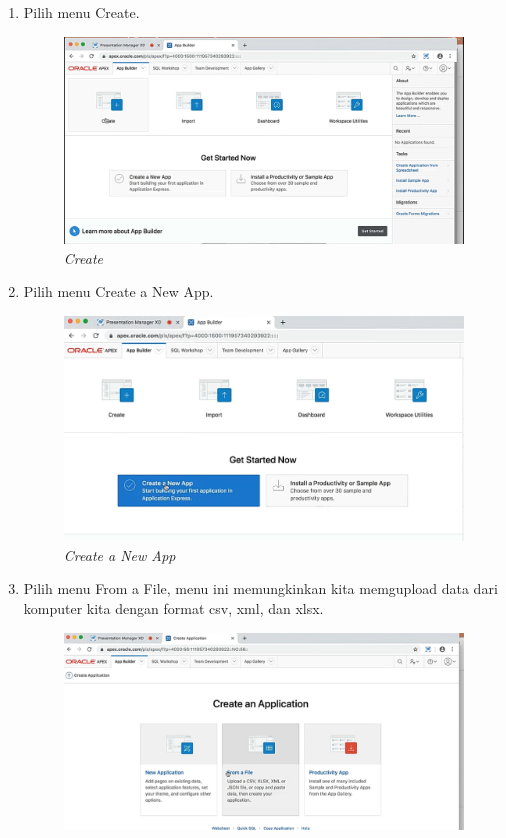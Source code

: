 \begin{enumerate}
\begin{figure}[H]
    \label{AppBuild}
\end{figure}
 \item Pilih menu Create.
 \begin{figure}[H]
    \centering
    \includegraphics[scale=0.5]{figures/4}
    \caption{\textit{Create}}
    \label{Create}
\end{figure}
 \item Pilih menu Create a New App.
 \begin{figure}[H]
    \centering
    \includegraphics[scale=0.5]{figures/5}
    \caption{\textit{Create a New App}}
    \label{CreateApp}
\end{figure}
 \item Pilih menu From a File, menu ini memungkinkan kita memgupload data dari komputer kita dengan format csv, xml, dan xlsx.
 \begin{figure}[H]
    \centering
    \includegraphics[scale=0.5]{figures/6}

\end{figure}
\end{enumerate}
